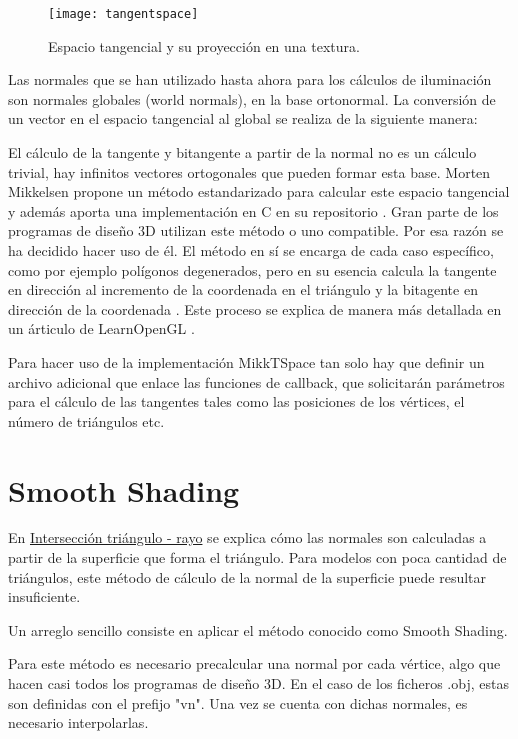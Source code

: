 \begin{figure}[H]
    \centering
	\texttt{[image: tangentspace]}
	\caption{Espacio tangencial y su proyección en una textura.}
	\label{fig:tangentspace}
\end{figure}
	
Las normales que se han utilizado hasta ahora para los cálculos de iluminación son normales globales (world normals), en la base ortonormal. La conversión de un vector en el espacio tangencial al global se realiza de la siguiente manera: 
	
El cálculo de la tangente y bitangente a partir de la normal no es un cálculo trivial, hay infinitos vectores ortogonales que pueden formar esta base. Morten Mikkelsen \cite{mikkelsen2008simulation} propone un método estandarizado para calcular este espacio tangencial y además aporta una implementación en C en su repositorio \cite{mikktspace}. Gran parte de los programas de diseño 3D utilizan este método o uno compatible. Por esa razón se ha decidido hacer uso de él. El método en sí se encarga de cada caso específico, como por ejemplo polígonos degenerados, pero en su esencia calcula la tangente en dirección al incremento de la coordenada  en el triángulo y la bitagente en dirección de la coordenada . Este proceso se explica de manera más detallada en un árticulo de LearnOpenGL \cite{learnopengl}.

Para hacer uso de la implementación MikkTSpace tan solo hay que definir un archivo adicional que enlace las funciones de callback, que solicitarán parámetros para el cálculo de las tangentes tales como las posiciones de los vértices, el número de triángulos etc.

	
\section{Smooth Shading}
	
En \hyperref[subsec:triintersection]{Intersección triángulo - rayo} se explica cómo las normales son calculadas a partir de la superficie que forma el triángulo. Para modelos con poca cantidad de triángulos, este método de cálculo de la normal de la superficie puede resultar insuficiente.
	
Un arreglo sencillo consiste en aplicar el método conocido como Smooth Shading. 
	
Para este método es necesario precalcular una normal por cada vértice, algo que hacen casi todos los programas de diseño 3D. En el caso de los ficheros .obj, estas son definidas con el prefijo "vn". Una vez se cuenta con dichas normales, es necesario interpolarlas. 


